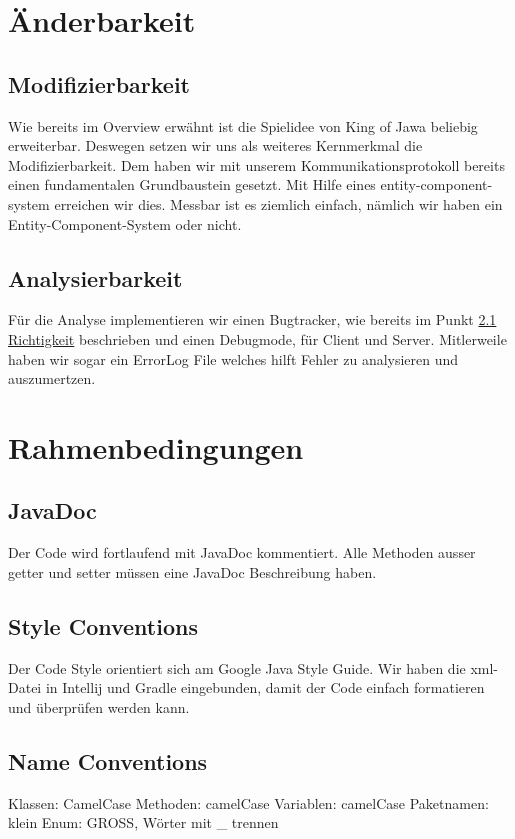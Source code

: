 \documentclass{scrartcl}
\newcommand{\n}{\newline}
\begin{document}
\section{Änderbarkeit}
\subsection{Modifizierbarkeit}
Wie bereits im Overview erwähnt ist die Spielidee von King of Jawa beliebig erweiterbar. Deswegen setzen wir uns als weiteres Kernmerkmal die Modifizierbarkeit. Dem haben wir mit unserem Kommunikationsprotokoll bereits  einen fundamentalen Grundbaustein gesetzt. Mit Hilfe eines entity-component-system erreichen wir dies. Messbar ist es ziemlich einfach, nämlich wir haben ein Entity-Component-System oder nicht. 

\subsection{Analysierbarkeit}
Für die Analyse implementieren wir einen Bugtracker, wie bereits im Punkt \hyperref[sec:Richtigkeit]{2.1 Richtigkeit} beschrieben und einen Debugmode, für Client und Server. Mitlerweile haben wir sogar ein ErrorLog File welches hilft Fehler zu analysieren und auszumertzen.

\section{Rahmenbedingungen}
\subsection{JavaDoc}
Der Code wird fortlaufend mit JavaDoc kommentiert.
Alle Methoden ausser getter und setter müssen eine JavaDoc Beschreibung haben.

\subsection{Style Conventions}
Der Code Style orientiert sich am Google Java Style Guide. Wir haben die xml-Datei in Intellij und Gradle eingebunden, damit der Code einfach formatieren und überprüfen werden kann.

\subsection{Name Conventions}
Klassen: CamelCase \n
Methoden: camelCase \n
Variablen: camelCase \n
Paketnamen: klein \n
Enum: GROSS, Wörter mit \_ trennen \n
\end{document}

